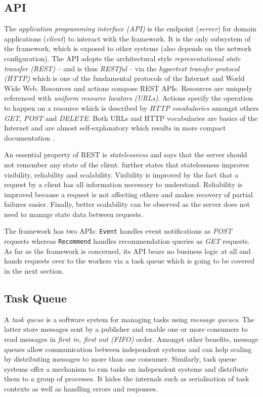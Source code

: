 \subsection{API}

The \emph{application programming interface (API)} is the endpoint (\emph{server}) for domain applications (\emph{client}) to interact with the framework. It is the only subsystem of the framework, which is exposed to other systems (also depends on the network configuration). The API adopts the architectural style \emph{representational state transfer (REST)} -- and is thus \emph{RESTful} -- via the \emph{hypertext transfer protocol (HTTP)} which is one of the fundamental protocols of the Internet and World Wide Web. Resources and actions compose REST APIs. Resources are uniquely referenced with \emph{uniform resource locators (URLs)}. Actions specify the operation to happen on a resource which is described by \emph{HTTP vocabularies} amongst others \emph{GET}, \emph{POST} and \emph{DELETE}. Both URLs and HTTP vocabularies are basics of the Internet and are almost self-explanatory which results in more compact documentation \cite{fielding00}.

An essential property of REST is \emph{statelessness} and says that the server should not remember any state of the client. \citet{fielding00} further states that statelessness improves visibility, reliability and scalability. Visibility is improved by the fact that a request by a client has all information necessary to understand. Reliability is improved because a request is not affecting others and makes recovery of partial failures easier. Finally, better scalability can be observed as the server does not need to manage state data between requests.

The framework has two APIs: \texttt{Event} handles event notifications as \emph{POST} requests whereas \texttt{Recommend} handles recommendation queries as \emph{GET} requests. As far as the framework is concerned, its API bears no business logic at all and hands requests over to the workers via a task queue which is going to be covered in the next section.

\subsection{Task Queue}

A \emph{task queue} is a software system for managing tasks using \emph{message queues}. The latter store messages sent by a publisher and enable one or more consumers to read messages in \emph{first in, first out (FIFO)} order. Amongst other benefits, message queues allow communication between independent systems and can help scaling by distributing messages to more than one consumer. Similarly, task queue systems offer a mechanism to run tasks on independent systems and distribute them to a group of processes. It hides the internals such as serialisation of task contexts as well as handling errors and responses.

